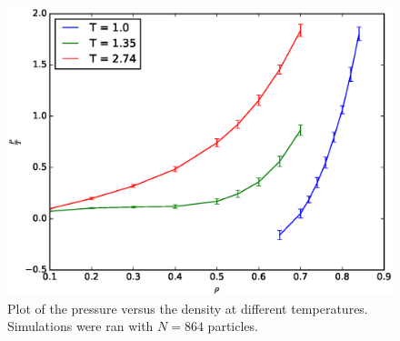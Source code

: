 \documentclass[twoside]{article}
\begin{document}
\begin{figure}
\centering
\includegraphics[width=0.65\linewidth]{fig/figure_pressure}
\caption{Plot of the pressure versus the density at different temperatures. Simulations were ran with $N=864$ particles.}
\label{fig:figure_pressure}
\end{figure}
\end{document}
